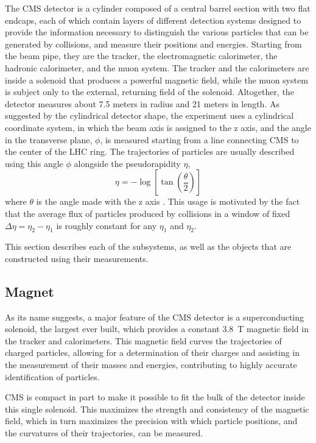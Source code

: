   The CMS detector is a cylinder composed of a central barrel section with two flat endcaps, each of which contain layers of different detection systems designed to provide the information necessary to distinguish the various particles that can be generated by collisions, and measure their positions and energies.
  Starting from the beam pipe, they are the tracker, the electromagnetic calorimeter, the hadronic calorimeter, and the muon system.
  The tracker and the calorimeters are inside a solenoid that produces a powerful magnetic field, while the muon system is subject only to the external, returning field of the solenoid.
  Altogether, the detector measures about 7.5 meters in radius and 21 meters in length.
  As suggested by the cylindrical detector shape, the experiment uses a cylindrical coordinate system, in which the beam axis is assigned to the z axis, and the angle in the transverse plane, $\phi$, is measured starting from a line connecting CMS to the center of the LHC ring.
  The trajectories of particles are usually described using this angle $\phi$ alongside the pseudorapidity $\eta$, 
  \begin{equation} \label{eqn:eta}
    \eta = -\log\left[\tan\left(\frac{\theta}{2}\right)\right]
  \end{equation}
  where $\theta$ is the angle made with the z axis \cite{cms_tdr}.
  This usage is motivated by the fact that the average flux of particles produced by collisions in a window of fixed $\Delta\eta=\eta_2-\eta_1$ is roughly constant for any $\eta_1$ and $\eta_2$.

  This section describes each of the subsystems, as well as the objects that are constructed using their measurements.

  \subsection{Magnet} \label{sec:magnet}

  As its name suggests, a major feature of the CMS detector is a superconducting solenoid, the largest ever built, which provides a constant 3.8~T magnetic field in the tracker and calorimeters.
  This magnetic field curves the trajectories of charged particles, allowing for a determination of their charges and assisting in the measurement of their masses and energies, contributing to highly accurate identification of particles.
  
  CMS is compact in part to make it possible to fit the bulk of the detector inside this single solenoid.
  This maximizes the strength and consistency of the magnetic field, which in turn maximizes the precision with which particle positions, and the curvatures of their trajectories, can be measured.

